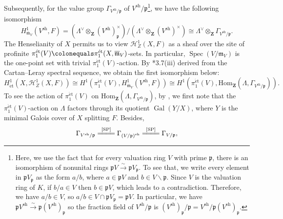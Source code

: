 \documentclass[a4paper,11pt,reqno]{amsart}
\newcommand{\GG}{\Gamma}
\newcommand{\GGL}{\Lambda}
\newcommand{\cH}{\mathcal{H}}
\newcommand{\fm}{\mathfrak{m}}
\newcommand{\fp}{\mathfrak{p}}
\newcommand{\ce}{\colonequals}
\newcommand{\ov}{\overline}
\renewcommand{\b}{\textbf}
\newcommand{\isom}{\simeq}			                                               %
\newcommand{\isoto}{\overset{\sim}{\longrightarrow}}
\newcommand{\et}{\mathrm{\acute{e}t}}	                                           %
\newcommand{\sh}{\mathrm{sh}}		                                              %
\newcommand{\etp}{\pi_1^{\mathrm{\acute{e}t}}}
\providecommand{\p}[1]{\left(#1\right)}
\providecommand{\SP}[1]{\cite[\href{https://stacks.math.columbia.edu/tag/#1}{#1}]{SP}}
\DeclareMathOperator{\Spec}{Spec}		                       %
\DeclareMathOperator{\Hom}{Hom}			                       %
\DeclareMathOperator{\Gal}{Gal}	                                                  %
\newcommand{\q}{\quad}
\theoremstyle{plain}
\theoremstyle{remark}
\theoremstyle{definition}
\theoremstyle{plain}
\theoremstyle{definition}
\theoremstyle{subsection-tweak}
\theoremstyle{subsection-tweak}
\numberwithin{equation}{subsection}
\begin{document}
      Subsequently, for the value group $\GG_{V^{\sh}/\fp}$ of $V^{\sh}/\fp$\footnote{Here, we use the fact that for every valuation ring $V$ with prime $\fp$, there is an isomorphism of nonunital rings $\fp V\isoto \fp V_{\fp}$.
      To see that, we write every element in $\fp V_{\fp}$ as the form $a/b$, where $a\in \fp V$ and $b\in V\backslash \fp$. 
      Since $V$ is the valuation ring of $K$, if $b/a\in V$ then $b\in \fp V$, which leads to a contradiction.
      Therefore, we have $a/b\in V$, so $a/b\in V\cap \fp V_{\fp}=\fp V$. In particular, we have $\fp V^{\sh}\isoto \fp (V^{\sh})_{\fp}$ so the fraction field of $V^{\sh}/\fp$ is $(V^{\sh})_{\fp}/\fp=V^{\sh}/\fp (V^{\sh})_{\fp}$.}, we have the following isomorphism
      \[
      H^1_{\ov{\fm}_V}(V^{\sh},F)=(\GGL^{\vee}\otimes_{\b{Z}}(V^{\sh})_{\fp}^{\times})/(\GGL^{\vee}\otimes_{\b{Z}}(V^{\sh})^{\times})\cong \GGL^{\vee}\otimes_{\b{Z}}\GG_{V^{\sh}/\fp}.
      \]
      The Henselianity of $X$ permits us to view $\cH^1_Z(X,F)$ as a sheaf over the site of profinite $\etp(V)\ce\etp(X,\ov{\fm}_V)$-sets.
      In particular, $\Spec(V/\fm_V)$ is the one-point set with trivial $\etp(V)$-action.
      By \cite{Sch13}*{3.7(iii)} derived from the Cartan--Leray spectral sequence, we obtain the first isomorphism below:
      \begin{equation}\label{h1}
        H^1_{\et}(X,\cH^1_Z(X,F)) \cong H^1(\etp(V),H^1_{\ov{\fm}_V}(V^{\sh},F)) \cong  H^1(\etp(V), \mathrm{Hom}_{\b{Z}}(\GGL,\GG_{V^{\sh}/\fp})).
      \end{equation}
      To see the action of $\etp(V)$ on $\mathrm{Hom}_{\b{Z}}(\GGL, \GG_{V^{\sh}/\fp})$, by , we first note that the $\etp(V)$-action on $\GGL$ factors through its quotient $\Gal(Y/X)$, where $Y$ is the minimal Galois cover of $X$ splitting $F$. 
      Besides, 
      \[
         \GG_{V^{\sh}/\fp}\stackrel{\text{\SP{05WS}}}{=\joinrel=\joinrel=\joinrel=} \GG_{\p{V/\fp}^{\sh}} \overset{\text{\SP{0ASK}}}{=\joinrel=\joinrel=\joinrel=} \GG_{V/\fp},
      \]
\end{document}
